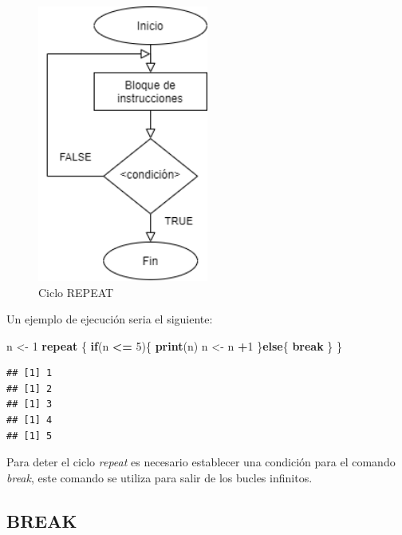 \documentclass[11pt,]{article}
\newenvironment{Shaded}{\begin{snugshade}}{\end{snugshade}}
\newcommand{\ControlFlowTok}[1]{\textcolor[rgb]{0.13,0.29,0.53}{\textbf{#1}}}
\newcommand{\DecValTok}[1]{\textcolor[rgb]{0.00,0.00,0.81}{#1}}
\newcommand{\KeywordTok}[1]{\textcolor[rgb]{0.13,0.29,0.53}{\textbf{#1}}}
\newcommand{\NormalTok}[1]{#1}
\newcommand{\OperatorTok}[1]{\textcolor[rgb]{0.81,0.36,0.00}{\textbf{#1}}}
\newcommand{\StringTok}[1]{\textcolor[rgb]{0.31,0.60,0.02}{#1}}
\begin{document}
\begin{figure}
\hypertarget{id}{%
\centering
\includegraphics[width=0.5\textwidth,height=0.3\textheight]{../schemas/REPEAT.png}
\caption{Ciclo REPEAT}\label{id}
}
\end{figure}

Un ejemplo de ejecución seria el siguiente:

\begin{Shaded}
\begin{Highlighting}[]
\NormalTok{n <-}\StringTok{ }\DecValTok{1}
\ControlFlowTok{repeat}\NormalTok{ \{}
  \ControlFlowTok{if}\NormalTok{(n }\OperatorTok{<=}\StringTok{ }\DecValTok{5}\NormalTok{)\{}
    \KeywordTok{print}\NormalTok{(n)}
\NormalTok{    n <-}\StringTok{ }\NormalTok{n }\OperatorTok{+}\DecValTok{1} 
\NormalTok{  \}}\ControlFlowTok{else}\NormalTok{\{}
    \ControlFlowTok{break}
\NormalTok{  \}}
\NormalTok{\}}
\end{Highlighting}
\end{Shaded}

\begin{verbatim}
## [1] 1
## [1] 2
## [1] 3
## [1] 4
## [1] 5
\end{verbatim}

Para deter el ciclo \emph{repeat} es necesario establecer una condición
para el comando \emph{break}, este comando se utiliza para salir de los
bucles infinitos.

\hypertarget{break}{%
\subsection{BREAK}\label{break}}
\end{document}

